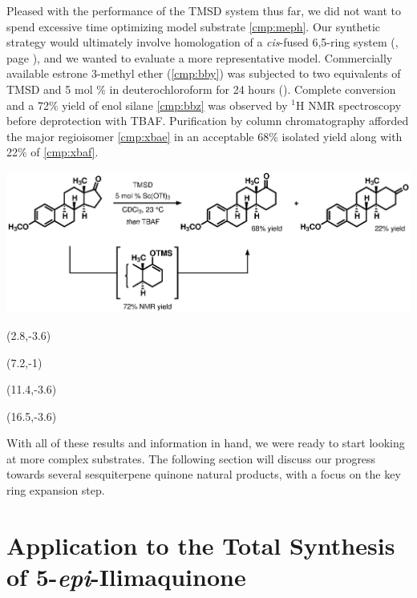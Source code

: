Pleased with the performance of the  TMSD system
thus far, we did not want to spend excessive time optimizing model substrate
\ref{cmp:meph}. Our synthetic strategy would ultimately involve homologation of
a \textit{cis}-fused 6,5-ring system (, page
\pageref{sch:strategydecalin}), and we wanted to evaluate a more representative model. Commercially
available estrone 3-methyl ether (\ref{cmp:bby}) was subjected to two equivalents of TMSD and 5 mol \%  in
deuterochloroform for 24 hours (). Complete
conversion and a 72\% yield of enol silane \ref{cmp:bbz} was observed by $^1$H NMR spectroscopy before deprotection
with TBAF. Purification by column chromatography afforded the major regioisomer
\ref{cmp:xbae} in an acceptable 68\% isolated yield along with 22\% of
\ref{cmp:xbaf}.
\begin{Scheme}[b]
  \centering \includegraphics[scale=0.8]{chp_singlecarbon/images/estrone}
  \caption{Single carbon homologation of estrone 3-methyl ether.}
\begin{textblock}{1}(2.8,-3.6)  \end{textblock}
\begin{textblock}{1}(7.2,-1)  \end{textblock}
\begin{textblock}{1}(11.4,-3.6)  \end{textblock}
\begin{textblock}{1}(16.5,-3.6)  \end{textblock}
  \label{sch:estrone}
\end{Scheme}

With all of these results and information in hand, we were ready to start
looking at more complex substrates. The following section will discuss our
progress towards several sesquiterpene quinone natural products, with a focus on
the key ring expansion step. 

\clearpage
\section{Application to the Total Synthesis of 5-\textit{epi}-Ilimaquinone}


